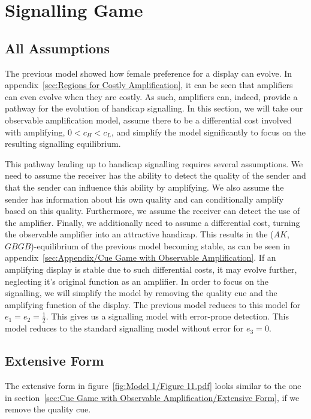 \documentclass[a4paper,12pt]{article}
\numberwithin{equation}{section}
\begin{document}
\section{Signalling Game}
\label{sec:Signalling Game}
\subsection{All Assumptions}
\label{sec:Signalling Game/All Assumptions}

The previous model showed how female preference for a display can evolve. In appendix~\ref{sec:Regions for Costly Amplification}, it can be seen that amplifiers can even evolve when they are costly. As such, amplifiers can, indeed, provide a pathway for the evolution of handicap signalling. In this section, we will take our observable amplification model, assume there to be a differential cost involved with amplifying, $0<c_{H}<c_{L}$, and simplify the model significantly to focus on the resulting signalling equilibrium.

This pathway leading up to handicap signalling requires several assumptions. We need to assume the receiver has the ability to detect the quality of the sender and that the sender can influence this ability by amplifying. We also assume the sender has information about his own quality and can conditionally amplify based on this quality. Furthermore, we assume the receiver can detect the use of the amplifier. Finally, we additionally need to assume a differential cost, turning the observable amplifier into an attractive handicap. This results in the ($AK$, $GBGB$)-equilibrium of the previous model becoming stable, as can be seen in appendix~\ref{sec:Appendix/Cue Game with Observable Amplification}. If an amplifying display is stable due to such differential costs, it may evolve further, neglecting it's original function as an amplifier. In order to focus on the signalling, we will simplify the model by removing the quality cue and the amplifying function of the display. The previous model reduces to this model for $e_{1}= e_{2} = \frac{1}{2}$. This gives us a signalling model with error-prone detection. This model reduces to the standard signalling model without error for $e_{3} = 0$.

\subsection{Extensive Form}
\label{sec:Signalling Game/Extensive Form}

The extensive form in figure~\ref{fig:Model 1/Figure 11.pdf} looks similar to the one in section~\ref{sec:Cue Game with Observable Amplification/Extensive Form}, if we remove the quality cue.
\end{document}
